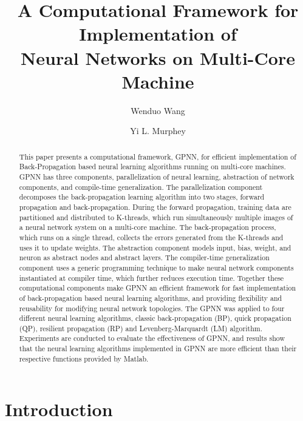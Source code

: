 \documentclass[procedia]{easychair}
\title{A Computational Framework for Implementation of\\
       Neural Networks on Multi-Core Machine}
\author{
    Wenduo Wang\inst{1}%
\and
    Yi L. Murphey\inst{2}%
}
\institute{
  University of Michigan-Dearborn,
  Dearborn, Michigan, U.S.A\\
  \email{wenduow@umich.edu}
\and
   University of Michigan-Dearborn,
   Dearborn, Michigan, U.S.A\\
   \email{yilu@umich.edu}\\
}
\begin{document}
\maketitle


\begin{abstract}

This paper presents a computational framework, GPNN, for efficient implementation of Back-Propagation based neural learning algorithms running on multi-core machines.  GPNN has three components, parallelization of neural learning, abstraction of network components, and compile-time generalization.  The parallelization component decomposes the back-propagation learning algorithm into two stages, forward propagation and back-propagation.  During the forward propagation, training data are partitioned and distributed to K-threads, which run simultaneously multiple images of a neural network system on a multi-core machine. The back-propagation process, which runs on a single thread, collects the errors generated from the K-threads and uses it to update weights.  The abstraction component models input, bias, weight, and neuron as abstract nodes and abstract layers.  The compiler-time generalization component uses a generic programming technique to make neural network components instantiated at compiler time, which further reduces execution time. Together these computational components make GPNN an efficient framework for fast implementation of back-propagation based neural learning algorithms, and providing flexibility and reusability for modifying neural network topologies.  The GPNN was applied to four different neural learning algorithms, classic back-propagation (BP), quick propagation (QP), resilient propagation (RP) and Levenberg-Marquardt (LM) algorithm. Experiments are conducted to evaluate the effectiveness of GPNN, and results show that the neural learning algorithms implemented in GPNN are more efficient than their respective functions provided by Matlab.

\end{abstract}


\section{Introduction}
\end{document}
